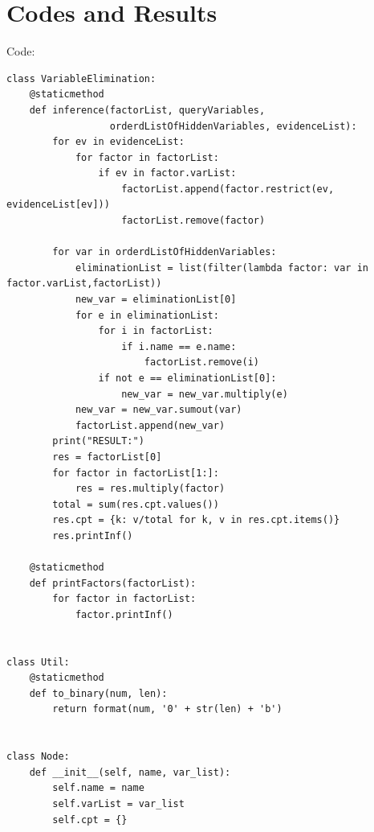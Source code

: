 \documentclass[a4paper, 11pt]{article}
\begin{document}
\section{Codes and Results}
Code:
\begin{lstlisting}
class VariableElimination:
    @staticmethod
    def inference(factorList, queryVariables,
                  orderdListOfHiddenVariables, evidenceList):
        for ev in evidenceList:
            for factor in factorList:
                if ev in factor.varList:
                    factorList.append(factor.restrict(ev, evidenceList[ev]))
                    factorList.remove(factor)

        for var in orderdListOfHiddenVariables:
            eliminationList = list(filter(lambda factor: var in factor.varList,factorList))
            new_var = eliminationList[0]
            for e in eliminationList:
                for i in factorList:
                    if i.name == e.name:
                        factorList.remove(i)
                if not e == eliminationList[0]:
                    new_var = new_var.multiply(e)
            new_var = new_var.sumout(var)
            factorList.append(new_var)
        print("RESULT:")
        res = factorList[0]
        for factor in factorList[1:]:
            res = res.multiply(factor)
        total = sum(res.cpt.values())
        res.cpt = {k: v/total for k, v in res.cpt.items()}
        res.printInf()

    @staticmethod
    def printFactors(factorList):
        for factor in factorList:
            factor.printInf()


class Util:
    @staticmethod
    def to_binary(num, len):
        return format(num, '0' + str(len) + 'b')


class Node:
    def __init__(self, name, var_list):
        self.name = name
        self.varList = var_list
        self.cpt = {}


\end{lstlisting}
\end{document}
